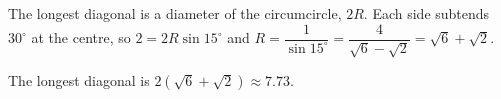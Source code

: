 The longest diagonal is a diameter of the circumcircle, $2R$. Each side subtends $30^\circ$ at the centre, so $2=2R\sin15^\circ$ and $R=\dfrac1{\sin15^\circ}=\dfrac4{\sqrt6-\sqrt2}=\sqrt6+\sqrt2$.

The longest diagonal is $\boxed{2\left(\sqrt6+\sqrt2\right)}\approx7.73$.
